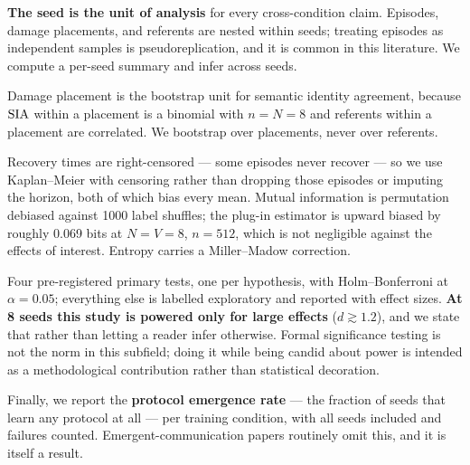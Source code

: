 \textbf{The seed is the unit of analysis} for every cross-condition claim.
Episodes, damage placements, and referents are nested within seeds; treating
episodes as independent samples is pseudoreplication, and it is common in this
literature. We compute a per-seed summary and infer across seeds.

Damage placement is the bootstrap unit for semantic identity agreement, because
$\mathrm{SIA}$ within a placement is a binomial with $n=N=8$ and referents within a
placement are correlated. We bootstrap over placements, never over referents.

Recovery times are right-censored --- some episodes never recover --- so we use
Kaplan--Meier with censoring rather than dropping those episodes or imputing the
horizon, both of which bias every mean. Mutual information is permutation
debiased against 1000 label shuffles; the plug-in estimator is upward biased by
roughly 0.069 bits at $N=V=8$, $n=512$, which is not negligible against the
effects of interest. Entropy carries a Miller--Madow correction.

Four pre-registered primary tests, one per hypothesis, with Holm--Bonferroni at
$\alpha = 0.05$; everything else is labelled exploratory and reported with effect
sizes. \textbf{At 8 seeds this study is powered only for large effects}
($d \gtrsim 1.2$), and we state that rather than letting a reader infer
otherwise. Formal significance testing is not the norm in this subfield; doing it
while being candid about power is intended as a methodological contribution
rather than statistical decoration.

Finally, we report the \textbf{protocol emergence rate} --- the fraction of seeds
that learn any protocol at all --- per training condition, with all seeds
included and failures counted. Emergent-communication papers routinely omit this,
and it is itself a result.

